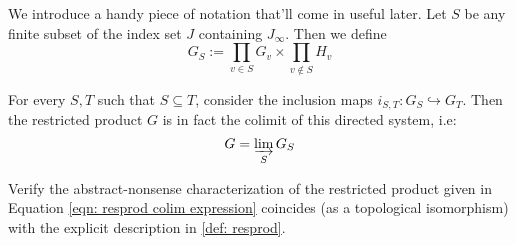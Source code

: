 \documentclass[11pt, x11names, openany]{book}
\newcommand{\inj}{\hookrightarrow}
\newcommand{\dlim}{\varinjlim}
\begin{document}
We introduce a handy piece of notation that'll come in useful later. Let $S$ be any finite subset of the index set $J$ containing $J_\infty$. Then we define
\begin{equation}
\label{eqn: G_S restricted prod}
    G_S := \prod_{v \in S} G_v \times \prod_{v \notin S} H_v
\end{equation}

For every $S, T$ such that $S \subseteq T$, consider the inclusion maps $i_{S, T}: G_S \inj G_T$. Then the restricted product $G$ is in fact the colimit of this directed system, i.e:
\begin{equation}
\label{eqn: resprod colim expression}
    G = \dlim_{S} G_S 
\end{equation}

\begin{exercise}
\label{exercise: restricted product as colimit}
Verify the abstract-nonsense characterization of the restricted product given in Equation \ref{eqn: resprod colim expression} coincides (as a topological isomorphism) with the explicit description in \ref{def: resprod}.
\end{exercise}
\end{document}
